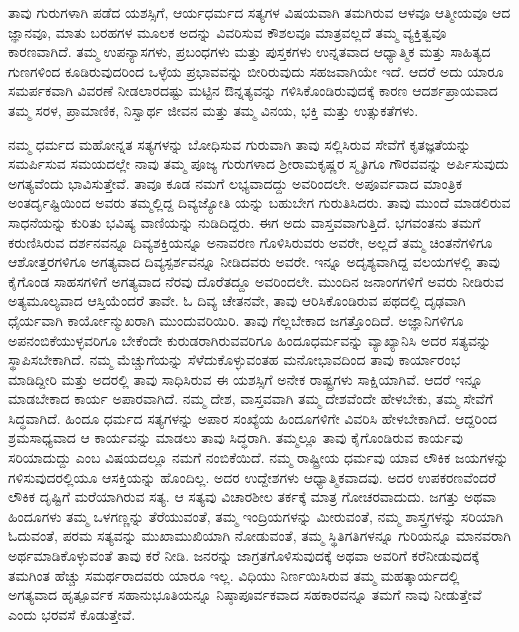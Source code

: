 ತಾವು ಗುರುಗಳಾಗಿ ಪಡೆದ ಯಶಸ್ಸಿಗೆ, ಆರ್ಯಧರ್ಮದ ಸತ್ಯಗಳ ವಿಷಯವಾಗಿ ತಮಗಿರುವ ಆಳವೂ ಆತ್ಮೀಯವೂ ಆದ ಜ್ಞಾನವೂ, ಮಾತು ಬರಹಗಳ ಮೂಲಕ ಅದನ್ನು ವಿವರಿಸುವ ಕೌಶಲವೂ ಮಾತ್ರವಲ್ಲದೆ ತಮ್ಮ ವ್ಯಕ್ತಿತ್ವವೂ ಕಾರಣವಾಗಿದೆ. ತಮ್ಮ ಉಪನ್ಯಾಸಗಳು, ಪ್ರಬಂಧಗಳು ಮತ್ತು ಪುಸ್ತಕಗಳು ಉನ್ನತವಾದ ಆಧ್ಯಾತ್ಮಿಕ ಮತ್ತು ಸಾಹಿತ್ಯದ ಗುಣಗಳಿಂದ ಕೂಡಿರುವುದರಿಂದ ಒಳ್ಳೆಯ ಪ್ರಭಾವವನ್ನು ಬೀರಿರುವುದು ಸಹಜವಾಗಿಯೇ ಇದೆ. ಆದರೆ ಅದು ಯಾರೂ ಸಮರ್ಪಕವಾಗಿ ವಿವರಣೆ ನೀಡಲಾರದಷ್ಟು ಮಟ್ಟಿನ ಔನ್ನತ್ಯವನ್ನು ಗಳಿಸಿಕೊಂಡಿರುವುದಕ್ಕೆ ಕಾರಣ ಆದರ್ಶಪ್ರಾಯವಾದ ತಮ್ಮ ಸರಳ, ಪ್ರಾಮಾಣಿಕ, ನಿಸ್ವಾರ್ಥ ಜೀವನ ಮತ್ತು ತಮ್ಮ ವಿನಯ, ಭಕ್ತಿ ಮತ್ತು ಉತ್ಸುಕತೆಗಳು.

ನಮ್ಮ ಧರ್ಮದ ಮಹೋನ್ನತ ಸತ್ಯಗಳನ್ನು ಬೋಧಿಸುವ ಗುರುವಾಗಿ ತಾವು ಸಲ್ಲಿಸಿರುವ ಸೇವೆಗೆ ಕೃತಜ್ಞತೆಯನ್ನು ಸಮರ್ಪಿಸುವ ಸಮಯದಲ್ಲೇ ನಾವು ತಮ್ಮ ಪೂಜ್ಯ ಗುರುಗಳಾದ ಶ‍್ರೀರಾಮಕೃಷ್ಣರ ಸ್ಮೃತಿಗೂ ಗೌರವವನ್ನು ಅರ್ಪಿಸುವುದು ಅಗತ್ಯವೆಂದು ಭಾವಿಸುತ್ತೇವೆ. ತಾವೂ ಕೂಡ ನಮಗೆ ಲಭ್ಯವಾದದ್ದು ಅವರಿಂದಲೇ. ಅಪೂರ್ವವಾದ ಮಾಂತ್ರಿಕ ಅಂತರ್ದೃಷ್ಟಿಯಿಂದ ಅವರು ತಮ್ಮಲ್ಲಿದ್ದ ದಿವ್ಯಜ್ಯೋತಿ ಯನ್ನು ಬಹುಬೇಗ ಗುರುತಿಸಿದರು. ತಾವು ಮುಂದೆ ಮಾಡಲಿರುವ ಸಾಧನೆಯನ್ನು ಕುರಿತು ಭವಿಷ್ಯ ವಾಣಿಯನ್ನು ನುಡಿದಿದ್ದರು. ಈಗ ಅದು ವಾಸ್ತವವಾಗುತ್ತಿದೆ. ಭಗವಂತನು ತಮಗೆ ಕರುಣಿಸಿರುವ ದರ್ಶನವನ್ನೂ ದಿವ್ಯಶಕ್ತಿಯನ್ನೂ ಅನಾವರಣ ಗೊಳಿಸಿರುವರು ಅವರೇ, ಅಲ್ಲದೆ ತಮ್ಮ ಚಿಂತನೆಗಳಿಗೂ ಆಶೋತ್ತರಗಳಿಗೂ ಅಗತ್ಯವಾದ ದಿವ್ಯಸ್ಪರ್ಶವನ್ನೂ ನೀಡಿದವರು ಅವರೇ. ಇನ್ನೂ ಅದೃಶ್ಯವಾಗಿದ್ದ ವಲಯಗಳಲ್ಲಿ ತಾವು ಕೈಗೊಂಡ ಸಾಹಸಗಳಿಗೆ ಅಗತ್ಯವಾದ ನೆರವು ದೊರೆತದ್ದೂ ಅವರಿಂದಲೇ. ಮುಂದಿನ ಜನಾಂಗಗಳಿಗೆ ಅವರು ನೀಡಿರುವ ಅತ್ಯಮೂಲ್ಯವಾದ ಆಸ್ತಿಯೆಂದರೆ ತಾವೇ. ಓ ದಿವ್ಯ ಚೇತನವೇ, ತಾವು ಆರಿಸಿಕೊಂಡಿರುವ ಪಥದಲ್ಲಿ ದೃಢವಾಗಿ ಧೈರ್ಯವಾಗಿ ಕಾರ್ಯೋನ್ಮುಖರಾಗಿ ಮುಂದುವರಿಯಿರಿ. ತಾವು ಗೆಲ್ಲಬೇಕಾದ ಜಗತ್ತೊಂದಿದೆ. ಅಜ್ಞಾನಿಗಳಿಗೂ ಅಪನಂಬಿಕೆಯುಳ್ಳವರಿಗೂ ಬೇಕೆಂದೇ ಕುರುಡರಾಗಿರುವವರಿಗೂ ಹಿಂದೂಧರ್ಮವನ್ನು ವ್ಯಾಖ್ಯಾನಿಸಿ ಅದರ ಸತ್ಯವನ್ನು ಸ್ಥಾಪಿಸಬೇಕಾಗಿದೆ. ನಮ್ಮ ಮೆಚ್ಚುಗೆಯನ್ನು ಸೆಳೆದುಕೊಳ್ಳುವಂತಹ ಮನೋಭಾವದಿಂದ ತಾವು ಕಾರ್ಯಾರಂಭ ಮಾಡಿದ್ದೀರಿ ಮತ್ತು ಅದರಲ್ಲಿ ತಾವು ಸಾಧಿಸಿರುವ ಈ ಯಶಸ್ಸಿಗೆ ಅನೇಕ ರಾಷ್ಟ್ರಗಳು ಸಾಕ್ಷಿಯಾಗಿವೆ. ಆದರೆ ಇನ್ನೂ ಮಾಡಬೇಕಾದ ಕಾರ್ಯ ಅಪಾರವಾಗಿದೆ. ನಮ್ಮ ದೇಶ, ವಾಸ್ತವವಾಗಿ ತಮ್ಮ ದೇಶವೆಂದೇ ಹೇಳಬೇಕು, ತಮ್ಮ ಸೇವೆಗೆ ಸಿದ್ಧವಾಗಿದೆ. ಹಿಂದೂ ಧರ್ಮದ ಸತ್ಯಗಳನ್ನು ಅಪಾರ ಸಂಖ್ಯೆಯ ಹಿಂದೂಗಳಿಗೇ ವಿವರಿಸಿ ಹೇಳಬೇಕಾಗಿದೆ. ಆದ್ದರಿಂದ ಶ್ರಮಸಾಧ್ಯವಾದ ಆ ಕಾರ್ಯವನ್ನು ಮಾಡಲು ತಾವು ಸಿದ್ಧರಾಗಿ. ತಮ್ಮಲ್ಲೂ ತಾವು ಕೈಗೊಂಡಿರುವ ಕಾರ್ಯವು ಸರಿಯಾದುದ್ದು ಎಂಬ ವಿಷಯದಲ್ಲೂ ನಮಗೆ ನಂಬಿಕೆಯಿದೆ. ನಮ್ಮ ರಾಷ್ಟ್ರೀಯ ಧರ್ಮವು ಯಾವ ಲೌಕಿಕ ಜಯಗಳನ್ನು ಗಳಿಸುವುದರಲ್ಲಿಯೂ ಆಸಕ್ತಿಯನ್ನು ಹೊಂದಿಲ್ಲ. ಅದರ ಉದ್ದೇಶಗಳು ಆಧ್ಯಾತ್ಮಿಕವಾದವು. ಅದರ ಉಪಕರಣವೆಂದರೆ ಲೌಕಿಕ ದೃಷ್ಟಿಗೆ ಮರೆಯಾಗಿರುವ ಸತ್ಯ. ಆ ಸತ್ಯವು ವಿಚಾರಶೀಲ ತರ್ಕಕ್ಕೆ ಮಾತ್ರ ಗೋಚರವಾದುದು. ಜಗತ್ತು ಅಥವಾ ಹಿಂದೂಗಳು ತಮ್ಮ ಒಳಗಣ್ಣನ್ನು ತೆರೆಯುವಂತೆ, ತಮ್ಮ ಇಂದ್ರಿಯಗಳನ್ನು ಮೀರುವಂತೆ, ನಮ್ಮ ಶಾಸ್ತ್ರಗಳನ್ನು ಸರಿಯಾಗಿ ಓದುವಂತೆ, ಪರಮ ಸತ್ಯವನ್ನು ಮುಖಾಮುಖಿಯಾಗಿ ನೋಡುವಂತೆ, ತಮ್ಮ ಸ್ಥಿತಿಗತಿಗಳನ್ನೂ ಗುರಿಯನ್ನೂ ಮಾನವರಾಗಿ ಅರ್ಥಮಾಡಿಕೊಳ್ಳುವಂತೆ ತಾವು ಕರೆ ನೀಡಿ. ಜನರನ್ನು ಜಾಗ್ರತಗೊಳಿಸುವುದಕ್ಕೆ ಅಥವಾ ಅವರಿಗೆ ಕರೆನೀಡುವುದಕ್ಕೆ ತಮಗಿಂತ ಹೆಚ್ಚು ಸಮರ್ಥರಾದವರು ಯಾರೂ ಇಲ್ಲ. ವಿಧಿಯು ನಿರ್ಣಯಿಸಿರುವ ತಮ್ಮ ಮಹತ್ಕಾರ್ಯದಲ್ಲಿ ಅಗತ್ಯವಾದ ಹೃತ್ಪೂರ್ವಕ ಸಹಾನುಭೂತಿಯನ್ನೂ ನಿಷ್ಠಾಪೂರ್ವಕವಾದ ಸಹಕಾರವನ್ನೂ ತಮಗೆ ನಾವು ನೀಡುತ್ತೇವೆ ಎಂದು ಭರವಸೆ ಕೊಡುತ್ತೇವೆ.

